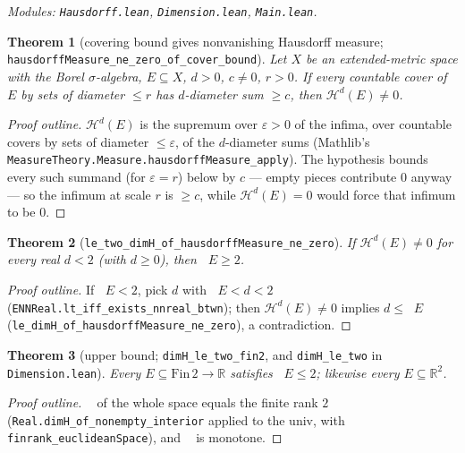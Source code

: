 \documentclass[11pt,a4paper]{article}
\newcommand{\R}{\mathbb{R}}
\DeclareMathOperator{\Hdim}{dim_H}
\newcommand{\HM}[1]{\mathcal{H}^{#1}}                %
\newcommand{\Plane}{\ensuremath{\mathbb{R}^{2}}}     %
\newcommand{\FinTwo}{\ensuremath{\mathrm{Fin}\,2 \to \R}}
\newcommand{\lname}[1]{\texttt{#1}}                  %
\newcommand{\lb}{\_\allowbreak}                      %
\newtheorem{theorem}{Theorem}[section]
\theoremstyle{definition}
\theoremstyle{remark}
\begin{document}
\emph{Modules: \lname{Hausdorff.lean}, \lname{Dimension.lean}, \lname{Main.lean}.}

\begin{theorem}[{covering bound gives nonvanishing Hausdorff measure;
\lname{hausdorffMeasure\lb ne\lb zero\lb of\lb cover\lb bound}}]
\label{thm:hm-nonzero}
Let $X$ be an extended-metric space with the Borel $\sigma$-algebra, $E\subseteq X$,
$d>0$, $c\neq0$, $r>0$.  If every countable cover of $E$ by sets of diameter $\le r$ has
$d$-diameter sum $\ge c$, then $\HM{d}(E)\neq0$.
\end{theorem}

\begin{proof}[Proof outline]
$\HM{d}(E)$ is the supremum over $\varepsilon>0$ of the infima, over countable covers by
sets of diameter $\le\varepsilon$, of the $d$-diameter sums
(Mathlib's \lname{MeasureTheory.Measure.hausdorffMeasure\lb apply}).  The hypothesis bounds
every such summand (for $\varepsilon=r$) below by $c$ --- empty pieces contribute $0$
anyway --- so the infimum at scale $r$ is $\ge c$, while $\HM{d}(E)=0$ would force that
infimum to be $0$.
\end{proof}

\begin{theorem}[{\lname{le\_two\_dimH\_of\_hausdorffMeasure\_ne\_zero}}]
\label{thm:ge-two}
If $\HM{d}(E)\neq0$ for every real $d<2$ (with $d\ge0$), then $\Hdim E\ge 2$.
\end{theorem}

\begin{proof}[Proof outline]
If $\Hdim E < 2$, pick $d$ with $\Hdim E < d < 2$
(\lname{ENNReal.lt\lb iff\lb exists\lb nnreal\lb btwn}); then
$\HM{d}(E)\neq0$ implies $d\le \Hdim E$
(\lname{le\lb dimH\lb of\lb hausdorffMeasure\lb ne\lb zero}), a contradiction.
\end{proof}

\begin{theorem}[{upper bound; \lname{dimH\_le\_two\_fin2}, and \lname{dimH\_le\_two} in
\lname{Dimension.lean}}]
\label{thm:le-two}
Every $E\subseteq\FinTwo$ satisfies $\Hdim E\le 2$; likewise every $E\subseteq\Plane$.
\end{theorem}

\begin{proof}[Proof outline]
$\Hdim$ of the whole space equals the finite rank $2$
(\lname{Real.dimH\lb of\lb nonempty\lb interior} applied to the univ, with
\lname{finrank\lb euclideanSpace}), and $\Hdim$ is monotone.
\end{proof}
\end{document}

